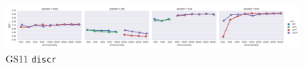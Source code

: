 \begin{figure}
  \centering

  \includegraphics[width=1.1\textwidth]{supplement/figures/GS11-interaction-discr}

  \caption{GS11 \texttt{discr}}
  \label{fig:gs11-discr}
\end{figure}
